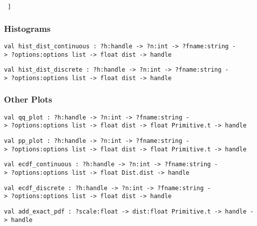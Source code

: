 \texttt{\ {]}}

\hypertarget{histograms}{\subsubsection{\texorpdfstring{\protect\hyperlink{histograms}{}Histograms}{Histograms}}\label{histograms}}

\protect\hyperlink{val-histux5fdistux5fcontinuous}{}\texttt{val\ hist\_dist\_continuous\ :\ ?⁠h:handle\ -\textgreater{}\ ?⁠n:int\ -\textgreater{}\ ?⁠fname:string\ -\textgreater{}\ ?⁠options:options\ list\ -\textgreater{}\ float\ dist\ -\textgreater{}\ handle}

\protect\hyperlink{val-histux5fdistux5fdiscrete}{}\texttt{val\ hist\_dist\_discrete\ :\ ?⁠h:handle\ -\textgreater{}\ ?⁠n:int\ -\textgreater{}\ ?⁠fname:string\ -\textgreater{}\ ?⁠options:options\ list\ -\textgreater{}\ float\ dist\ -\textgreater{}\ handle}

\hypertarget{otherux5fplots}{\subsubsection{\texorpdfstring{\protect\hyperlink{otherux5fplots}{}Other
Plots}{Other Plots}}\label{otherux5fplots}}

\protect\hyperlink{val-qqux5fplot}{}\texttt{val\ qq\_plot\ :\ ?⁠h:handle\ -\textgreater{}\ ?⁠n:int\ -\textgreater{}\ ?⁠fname:string\ -\textgreater{}\ ?⁠options:options\ list\ -\textgreater{}\ float\ dist\ -\textgreater{}\ float\ Primitive.t\ -\textgreater{}\ handle}

\protect\hyperlink{val-ppux5fplot}{}\texttt{val\ pp\_plot\ :\ ?⁠h:handle\ -\textgreater{}\ ?⁠n:int\ -\textgreater{}\ ?⁠fname:string\ -\textgreater{}\ ?⁠options:options\ list\ -\textgreater{}\ float\ dist\ -\textgreater{}\ float\ Primitive.t\ -\textgreater{}\ handle}

\protect\hyperlink{val-ecdfux5fcontinuous}{}\texttt{val\ ecdf\_continuous\ :\ ?⁠h:handle\ -\textgreater{}\ ?⁠n:int\ -\textgreater{}\ ?⁠fname:string\ -\textgreater{}\ ?⁠options:options\ list\ -\textgreater{}\ float\ Dist.dist\ -\textgreater{}\ handle}

\protect\hyperlink{val-ecdfux5fdiscrete}{}\texttt{val\ ecdf\_discrete\ :\ ?⁠h:handle\ -\textgreater{}\ ?⁠n:int\ -\textgreater{}\ ?⁠fname:string\ -\textgreater{}\ ?⁠options:options\ list\ -\textgreater{}\ float\ dist\ -\textgreater{}\ handle}

\protect\hyperlink{val-addux5fexactux5fpdf}{}\texttt{val\ add\_exact\_pdf\ :\ ?⁠scale:float\ -\textgreater{}\ dist:float\ Primitive.t\ -\textgreater{}\ handle\ -\textgreater{}\ handle}

